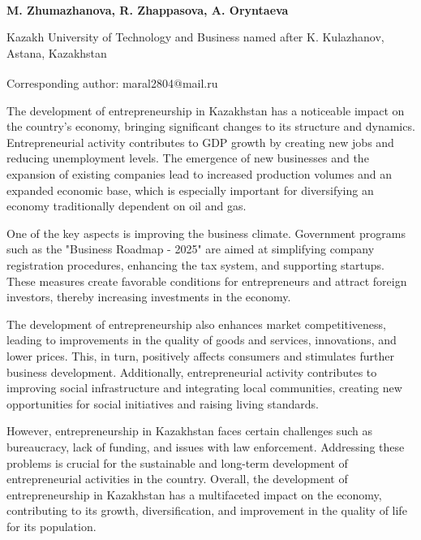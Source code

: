 

\begin{articleheader}

{\bfseries M. Zhumazhanova\textsuperscript{\envelope }, R. Zhappasova, A. Oryntaeva}
\end{articleheader}
\begin{affiliation}

Kazakh University of Technology and Business named after K. Kulazhanov,
Astana, Kazakhstan

\raggedright {\bfseries \textsuperscript{\envelope }}Corresponding author: maral2804@mail.ru
\end{affiliation}

The development of entrepreneurship in Kazakhstan has a noticeable
impact on the country's economy, bringing significant changes to its
structure and dynamics. Entrepreneurial activity contributes to GDP
growth by creating new jobs and reducing unemployment levels. The
emergence of new businesses and the expansion of existing companies lead
to increased production volumes and an expanded economic base, which is
especially important for diversifying an economy traditionally dependent
on oil and gas.

One of the key aspects is improving the business climate. Government
programs such as the "Business Roadmap - 2025" are aimed at simplifying
company registration procedures, enhancing the tax system, and
supporting startups. These measures create favorable conditions for
entrepreneurs and attract foreign investors, thereby increasing
investments in the economy.

The development of entrepreneurship also enhances market
competitiveness, leading to improvements in the quality of goods and
services, innovations, and lower prices. This, in turn, positively
affects consumers and stimulates further business development.
Additionally, entrepreneurial activity contributes to improving social
infrastructure and integrating local communities, creating new
opportunities for social initiatives and raising living standards.

However, entrepreneurship in Kazakhstan faces certain challenges such as
bureaucracy, lack of funding, and issues with law enforcement.
Addressing these problems is crucial for the sustainable and long-term
development of entrepreneurial activities in the country. Overall, the
development of entrepreneurship in Kazakhstan has a multifaceted impact
on the economy, contributing to its growth, diversification, and
improvement in the quality of life for its population.

